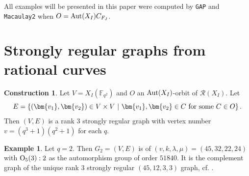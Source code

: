 \documentclass[11pt]{amsart}
\newcommand{\lt}{{}^\mathrm t\hspace{-0.5mm}}
\newcommand{\pmat}[1]{\begin{pmatrix} #1 \end{pmatrix}}
\theoremstyle{plain} %
\theoremstyle{definition} %
\newtheorem{ex}[thm]{Example} %
\newtheorem{const}{Construction}
\theoremstyle{remark} %
\begin{document}
All examples will be presented in this paper were computed by \texttt{GAP} and \texttt{Macaulay2} when $O={\rm Aut}(X_I)C_{F_J}$.

\section{Strongly regular graphs from rational curves}
\begin{const}\label{con1}%
Let $V=X_I(\mathbb{F}_{q^2})$ and $O$ an ${\rm Aut}(X_I)$-orbit of $\mathcal{R}(X_I)$. Let
$$
E=\left\{(\bm{v_1},\bm{v_2})\in V\times V\ \middle\vert\ \bm{v_1},\bm{v_2}\in C\ {\rm for}\ {\rm some}\ C\in O \right\}.
$$
Then $(V,E)$ is a rank $3$ strongly regular graph with vertex number $v=(q^3+1)(q^2+1)$ for each $q$.
\end{const}
\begin{ex}%
Let $q=2$. Then $G_2=(V,E)$ is of $(v,k,\lambda,\mu)=(45,32,22,24)$ with ${\rm O}_5(3):2$ as the automorphism group of order $51840$. It is the complement graph of the unique rank 3 strongly regular $(45,12,3,3)$ graph, cf. \cite[\S10.17]{BV}.
\end{ex}
\end{document}

